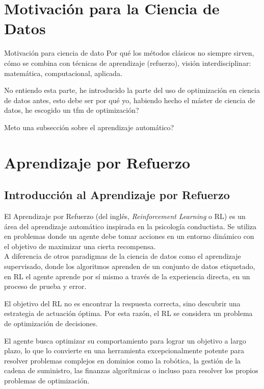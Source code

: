 \documentclass[12pt,a4paper]{book}
\begin{document}
\section{Motivación para la Ciencia de Datos}

\color{red}
Motivación para ciencia de dato Por qué los métodos clásicos no siempre sirven, cómo se combina con técnicas de aprendizaje (refuerzo), visión interdisciplinar: matemática, computacional, aplicada.

No entiendo esta parte, he introducido la parte del uso de optimización en ciencia de datos antes, esto debe ser por qué yo, habiendo hecho el máster de ciencia de datos, he escogido un tfm de optimización?

\color{black}

\color{red} Meto una subsección sobre el aprendizaje automático?\color{black}
\section{Aprendizaje por Refuerzo}

\subsection{Introducción al Aprendizaje por Refuerzo}

El Aprendizaje por Refuerzo \cite{intro_reforzado} (del inglés, \textit{Reinforcement Learning} o RL) es un área del aprendizaje automático inspirada en la psicología conductista. Se utiliza en problemas donde un agente debe tomar acciones en un entorno dinámico con el objetivo de maximizar una cierta recompensa.\\
A diferencia de otros paradigmas de la ciencia de datos como el aprendizaje supervisado, donde los algoritmos aprenden de un conjunto de datos etiquetado, en RL el agente aprende por sí mismo a través de la experiencia directa, en un proceso de prueba y error. 

El objetivo del RL no es encontrar la respuesta correcta, sino descubrir una estrategia de actuación óptima. Por esta razón, el RL se considera un problema de optimización de decisiones.

El agente busca optimizar su comportamiento para lograr un objetivo a largo plazo, lo que lo convierte en una herramienta excepcionalmente potente para resolver problemas complejos en dominios como la robótica, la gestión de la cadena de suministro, las finanzas algorítmicas o incluso para resolver los propios problemas de optimización.
\end{document}
